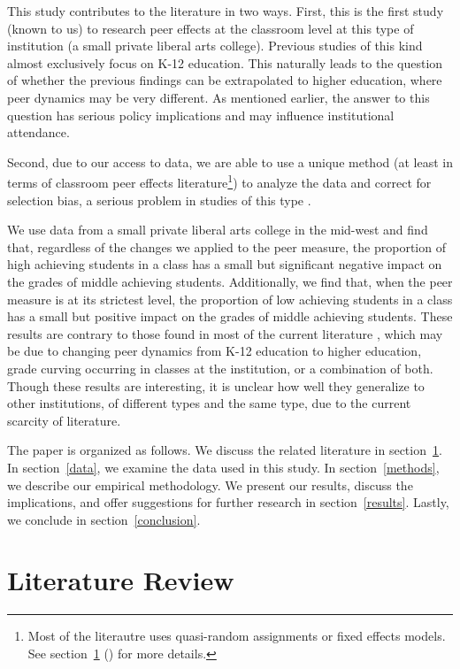 \documentclass[12pt,letterpaper,english,fleqn]{article}
\newcommand{\sectlabel}[1]{section~\ref{#1} (\nameref{#1})}
\begin{document}
This study contributes to the literature in two ways.
First, this is the first study (known to us) to research peer effects at the classroom level at this type of institution (a small private liberal arts college). 
Previous studies of this kind  almost exclusively focus on K-12 education. 
This naturally leads to the question of whether the previous findings can be extrapolated to higher education, where peer dynamics may be very different. 
As mentioned earlier, the answer to this question has serious policy implications and may influence institutional attendance.

Second, due to our access to data, we are able to use a unique method (at least in terms of classroom peer effects literature\footnote{Most of the literautre uses quasi-random assignments or fixed effects models. See \sectlabel{litreview} for more details.}) to analyze the data and correct for selection bias, a serious problem in studies of this type \citep{carman2012classroom,burke2013classroom,ding2007peers}. 

We use data from a small private liberal arts college in the mid-west and find that, regardless of the changes we applied to the peer measure, the proportion of high achieving students in a class has a small but significant negative impact on the grades of middle achieving students. 
Additionally, we find that, when the peer measure is at its strictest level, the proportion of low achieving students in a class has a small but positive impact on the grades of middle achieving students. 
These results are contrary to those found in most of the current literature \citep{kang2007classroom,carman2012classroom,burke2013classroom,schlosser2008inside,lavy2012good}, which may be due to changing peer dynamics from K-12 education to higher education, grade curving occurring in classes at the institution, or a combination of both.
Though these results are interesting, it is unclear how well they generalize to other institutions, of different types and the same type, due to the current scarcity of literature. 

The paper is organized as follows. 
We discuss the related literature in section~\ref{litreview}. 
In section~\ref{data}, we examine the data used in this study. 
In section~\ref{methods}, we describe our empirical methodology.
We present our results, discuss the implications, and offer suggestions for further research in section~\ref{results}.
Lastly, we conclude in section~\ref{conclusion}.

\section{Literature Review}\label{litreview}
\end{document}
